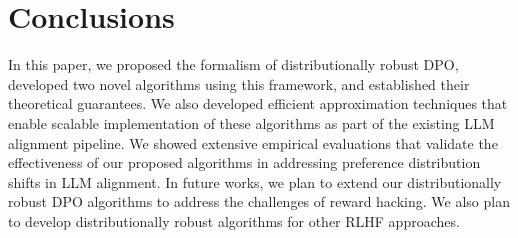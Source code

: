 \section{Conclusions}
In this paper, we proposed the formalism of distributionally robust DPO,  developed two novel algorithms using this framework,  and established their theoretical guarantees. We also developed efficient approximation techniques that enable scalable implementation of these algorithms as part of the existing LLM alignment pipeline. We showed extensive empirical evaluations that validate the effectiveness of our proposed algorithms in addressing preference distribution shifts in LLM alignment. In future works, we plan to extend our distributionally robust DPO algorithms to address the challenges of reward hacking. We also plan to develop distributionally robust algorithms for other RLHF approaches. 
